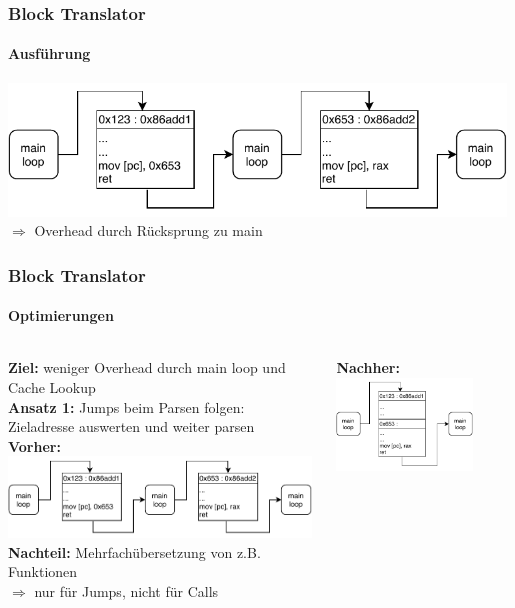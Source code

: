 \documentclass[german]{tum-presentation}
\begin{document}
\begin{frame}[fragile]
	\frametitle{Block Translator}
	\framesubtitle{Ausführung}
	\includegraphics[width=0.99\textwidth]{diagrams/unchained}\\
	\vspace{1cm}
	\textbf{$\Rightarrow$} Overhead durch Rücksprung zu main
\end{frame}

\begin{frame}[fragile]
	\frametitle{Block Translator}
	\framesubtitle{Optimierungen}
	\begin{columns}
		\begin{column}{0.5\textwidth}
		\textbf{Ziel:} weniger Overhead durch main loop und Cache Lookup \\
		\onslide<2->
		\vspace{0.5cm}
		\textbf{Ansatz 1:} Jumps beim Parsen folgen: \\		Zieladresse auswerten und weiter parsen \\
		\onslide<3->
		\vspace{0.5cm}
		\textbf{Vorher:} \\
		\includegraphics[width=0.99\textwidth]{diagrams/unchained}\\
		\onslide<5->
		\vspace{1cm}
		\textbf{Nachteil:} Mehrfachübersetzung von z.B. Funktionen \\
		\onslide<6->
		\textbf{$\Rightarrow$} nur für Jumps, nicht für Calls
		\end{column}
		\begin{column}{0.5\textwidth}
		\onslide<4->
		\textbf{Nachher:}\\
		\vspace{0.5cm}
		\includegraphics[width=0.78\textwidth]{diagrams/jal_follow}

\end{column}
\end{columns}
\end{frame}
\end{document}
